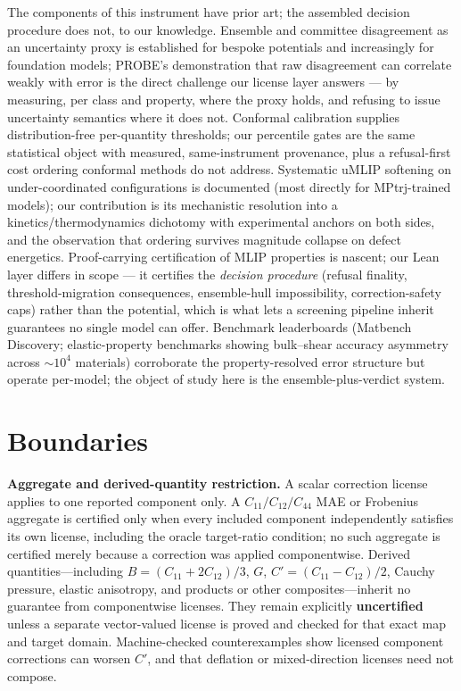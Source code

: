 \documentclass[11pt]{article}
\theoremstyle{definition}
\theoremstyle{remark}
\begin{document}
The components of this instrument have prior art; the assembled decision procedure does not, to our knowledge. Ensemble and committee disagreement as an uncertainty proxy is established for bespoke potentials and increasingly for foundation models; PROBE's demonstration that raw disagreement can correlate weakly with error is the direct challenge our license layer answers --- by measuring, per class and property, where the proxy holds, and refusing to issue uncertainty semantics where it does not. Conformal calibration supplies distribution-free per-quantity thresholds; our percentile gates are the same statistical object with measured, same-instrument provenance, plus a refusal-first cost ordering conformal methods do not address. Systematic uMLIP softening on under-coordinated configurations is documented (most directly for MPtrj-trained models); our contribution is its mechanistic resolution into a kinetics/thermodynamics dichotomy with experimental anchors on both sides, and the observation that ordering survives magnitude collapse on defect energetics. Proof-carrying certification of MLIP properties is nascent; our Lean layer differs in scope --- it certifies the \emph{decision procedure} (refusal finality, threshold-migration consequences, ensemble-hull impossibility, correction-safety caps) rather than the potential, which is what lets a screening pipeline inherit guarantees no single model can offer. Benchmark leaderboards (Matbench Discovery; elastic-property benchmarks showing bulk--shear accuracy asymmetry across $\sim 10^4$ materials) corroborate the property-resolved error structure but operate per-model; the object of study here is the ensemble-plus-verdict system.

\section*{Boundaries}

\noindent\textbf{Aggregate and derived-quantity restriction.} A scalar correction license applies to one reported component only. A $C_{11}/C_{12}/C_{44}$ MAE or Frobenius aggregate is certified only when every included component independently satisfies its own license, including the oracle target-ratio condition; no such aggregate is certified merely because a correction was applied componentwise. Derived quantities---including $B=(C_{11}+2C_{12})/3$, $G$, $C'=(C_{11}-C_{12})/2$, Cauchy pressure, elastic anisotropy, and products or other composites---inherit no guarantee from componentwise licenses. They remain explicitly \textbf{uncertified} unless a separate vector-valued license is proved and checked for that exact map and target domain. Machine-checked counterexamples show licensed component corrections can worsen $C'$, and that deflation or mixed-direction licenses need not compose.
\end{document}
